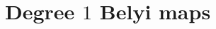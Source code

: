 \documentclass{dcthesis}
\newcommand{\PP}{\mathbb P}
\newcommand{\ZZ}{\mathbb Z}
\newcommand{\defi}[1]{\textsf{#1}}
\newcommand{\wt}[1]{\widetilde{#1}}
\numberwithin{equation}{section}
\newtheorem{lemma}[equation]{Lemma}
\theoremstyle{definition}
\newtheorem{definition}[equation]{Definition}
\newtheorem{notation}[equation]{Notation}
\theoremstyle{remark}
\begin{document}
{  \section{Degree $1$ Belyi maps}{\label{sec:degree1}
  }
}
\end{document}
